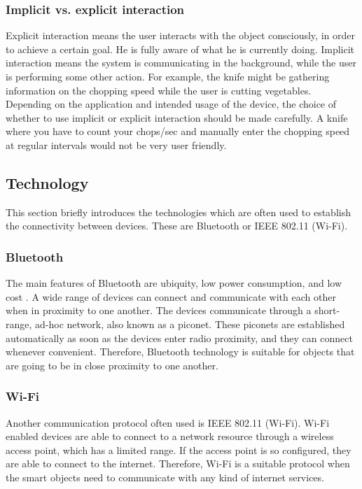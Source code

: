\subsubsection{Implicit vs. explicit interaction}
Explicit interaction means the user interacts with the object consciously, in order to achieve a certain goal.
He is fully aware of what he is currently doing.
Implicit interaction means the system is communicating in the background, while the user is performing some other action.
For example, the knife might be gathering information on the chopping speed while the user is cutting vegetables. Depending on the application and intended usage of the device, the choice of whether to use implicit or explicit interaction should be made carefully.
A knife where you have to count your chops/sec and manually enter the chopping speed at regular intervals would not be very user friendly.

\subsection{Technology}
\label{sec:techniques}
This section briefly introduces the technologies which are often used to establish the connectivity between devices. These are Bluetooth \cite{bluetoothPatent} or IEEE 802.11 (Wi-Fi).
\subsubsection{Bluetooth}
The main features of Bluetooth are ubiquity, low power consumption, and low cost \cite{btbasics}.
A wide range of devices can connect and communicate with each other when in proximity to one another.
The devices communicate through a short-range, ad-hoc network, also known as a piconet.
These piconets are established automatically as soon as the devices enter radio proximity, and they can connect whenever convenient.
Therefore, Bluetooth technology is suitable for objects that are going to be in close proximity to one another. 

\subsubsection{Wi-Fi}
Another communication protocol often used is IEEE 802.11 (Wi-Fi).
Wi-Fi enabled devices are able to connect to a network resource through a wireless access point, which has a limited range.
If the access point is so configured, they are able to connect to the internet.
Therefore, Wi-Fi is a suitable protocol when the smart objects need to communicate with any kind of internet services.

